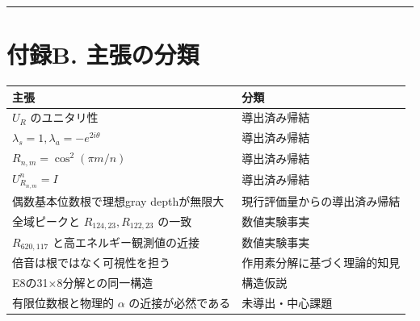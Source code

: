 \documentclass[
  10pt,
  a4paper,
]{article}
\newcounter{none} %
\begin{document}
\begin{center}\rule{0.5\linewidth}{0.5pt}\end{center}

\section{付録B.
主張の分類}\label{ux4ed8ux9332b.-ux4e3bux5f35ux306eux5206ux985e}

{\def\LTcaptype{none} %
\begin{longtable}[]{@{}
  >{\raggedright\arraybackslash}p{}
  >{\raggedright\arraybackslash}p{}@{}}
\toprule\noalign{}
\begin{minipage}[b]{\linewidth}\raggedright
主張
\end{minipage} & \begin{minipage}[b]{\linewidth}\raggedright
分類
\end{minipage} \\
\midrule\noalign{}
\endhead
\bottomrule\noalign{}
\endlastfoot
\(U_R\) のユニタリ性 & 導出済み帰結 \\
\(\lambda_s=1,\lambda_a=-e^{2i\theta}\) & 導出済み帰結 \\
\(R_{n,m}=\cos^2(\pi m/n)\) & 導出済み帰結 \\
\(U_{R_{n,m}}^n=I\) & 導出済み帰結 \\
偶数基本位数根で理想gray depthが無限大 & 現行評価量からの導出済み帰結 \\
全域ピークと \(R_{124,23},R_{122,23}\) の一致 & 数値実験事実 \\
\(R_{620,117}\) と高エネルギー観測値の近接 & 数値実験事実 \\
倍音は根ではなく可視性を担う & 作用素分解に基づく理論的知見 \\
E8の31×8分解との同一構造 & 構造仮説 \\
有限位数根と物理的 \(\alpha\) の近接が必然である & 未導出・中心課題 \\
\end{longtable}
}
\end{document}
